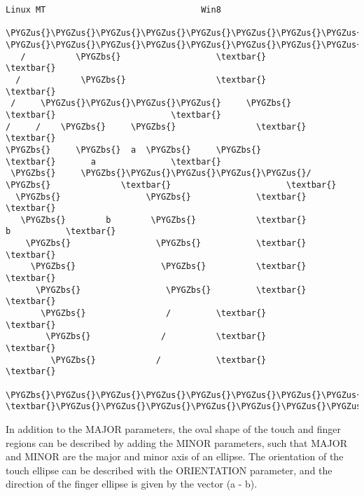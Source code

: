 \documentclass[a4paper,8pt,english]{sphinxmanual}
\def\PYGZbs{\char`\\}
\def\PYGZus{\char`\_}
\begin{document}
\begin{Verbatim}[commandchars=\\\{\}]
     Linux MT                               Win8
    \PYGZus{}\PYGZus{}\PYGZus{}\PYGZus{}\PYGZus{}\PYGZus{}\PYGZus{}\PYGZus{}\PYGZus{}\PYGZus{}                     \PYGZus{}\PYGZus{}\PYGZus{}\PYGZus{}\PYGZus{}\PYGZus{}\PYGZus{}\PYGZus{}\PYGZus{}\PYGZus{}\PYGZus{}\PYGZus{}\PYGZus{}\PYGZus{}\PYGZus{}\PYGZus{}\PYGZus{}\PYGZus{}\PYGZus{}\PYGZus{}\PYGZus{}\PYGZus{}\PYGZus{}
   /          \PYGZbs{}                   \textbar{}                       \textbar{}
  /            \PYGZbs{}                  \textbar{}                       \textbar{}
 /     \PYGZus{}\PYGZus{}\PYGZus{}\PYGZus{}     \PYGZbs{}                 \textbar{}                       \textbar{}
/     /    \PYGZbs{}     \PYGZbs{}                \textbar{}                       \textbar{}
\PYGZbs{}     \PYGZbs{}  a  \PYGZbs{}     \PYGZbs{}               \textbar{}       a               \textbar{}
 \PYGZbs{}     \PYGZbs{}\PYGZus{}\PYGZus{}\PYGZus{}\PYGZus{}/      \PYGZbs{}              \textbar{}                       \textbar{}
  \PYGZbs{}                 \PYGZbs{}             \textbar{}                       \textbar{}
   \PYGZbs{}        b        \PYGZbs{}            \textbar{}           b           \textbar{}
    \PYGZbs{}                 \PYGZbs{}           \textbar{}                       \textbar{}
     \PYGZbs{}                 \PYGZbs{}          \textbar{}                       \textbar{}
      \PYGZbs{}                 \PYGZbs{}         \textbar{}                       \textbar{}
       \PYGZbs{}                /         \textbar{}                       \textbar{}
        \PYGZbs{}              /          \textbar{}                       \textbar{}
         \PYGZbs{}            /           \textbar{}                       \textbar{}
          \PYGZbs{}\PYGZus{}\PYGZus{}\PYGZus{}\PYGZus{}\PYGZus{}\PYGZus{}\PYGZus{}\PYGZus{}\PYGZus{}\PYGZus{}/            \textbar{}\PYGZus{}\PYGZus{}\PYGZus{}\PYGZus{}\PYGZus{}\PYGZus{}\PYGZus{}\PYGZus{}\PYGZus{}\PYGZus{}\PYGZus{}\PYGZus{}\PYGZus{}\PYGZus{}\PYGZus{}\PYGZus{}\PYGZus{}\PYGZus{}\PYGZus{}\PYGZus{}\PYGZus{}\PYGZus{}\PYGZus{}\textbar{}
\end{Verbatim}

In addition to the MAJOR parameters, the oval shape of the touch and finger
regions can be described by adding the MINOR parameters, such that MAJOR
and MINOR are the major and minor axis of an ellipse. The orientation of
the touch ellipse can be described with the ORIENTATION parameter, and the
direction of the finger ellipse is given by the vector (a - b).
\end{document}
